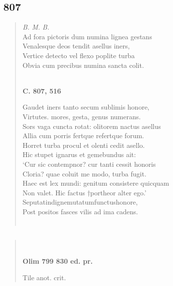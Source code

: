 \documentclass[11pt, a4paper]{report}
\begin{document}
            \subsection*{807}
      \begin{verse}
      \textit{B. M. B.} \\ Ad fora pictoris dum numina lignea gestans \\ Venalesque deos tendit asellus iners, \\ Vertice detecto vel flexo poplite turba \\ Obvia cum precibus numina sancta colit. \\ 
        ﻿\pagebreak 
     \marginpar{[282]} \begin{center} \textbf{C. 807, 516} \end{center}Gaudet iners tanto secum sublimis honore, \\ Virtutes. mores, gesta, genus numerans. \\ Sors vaga cuncta rotat: olitorem nactus asellus \\ Allia cum porris fertque refertque forum. \\ Horret turba procul et olenti cedit asello. \\ Hic stupet ignarus et gemebundus ait: \\ ‘Cur sic contempnor? cur tanti cessit honoris \\ Cloria? quae coluit me modo, turba fugit. \\ Haec est lex mundi: genitum consistere quicquam \\ Non valet. Hic factus †portheor alter ego.’ \\ Seputatindignemutatumfunctushonore, \\ Post positos fasces vilis ad ima cadens. \\ 
        ﻿\pagebreak 
    
      \end{verse}
  
            \subsection*{}
      \begin{verse}
      \end{verse}
  
            \subsection*{}
      \begin{verse}
        ﻿\pagebreak 
    \begin{center} \textbf{Olim 799 830 ed. pr.} \end{center}Tile anot. crit. \\ 
      \end{verse}
  
\end{document}
